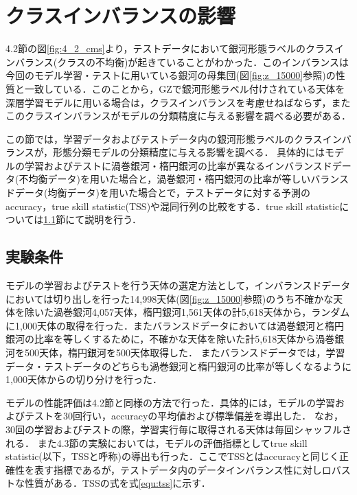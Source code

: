 \documentclass[a4j, 11pt]{jreport}
\begin{document}


\newpage
\section{クラスインバランスの影響}
4.2節の図\ref{fig:4_2_cms}より，テストデータにおいて銀河形態ラベルのクラスインバランス(クラスの不均衡)が起きていることがわかった．このインバランスは今回のモデル学習・テストに用いている銀河の母集団(図\ref{fig:z_15000}参照)の性質と一致している．このことから，GZで銀河形態ラベル付けされている天体を深層学習モデルに用いる場合は，クラスインバランスを考慮せねばならず，またこのクラスインバランスがモデルの分類精度に与える影響を調べる必要がある．

この節では，学習データおよびテストデータ内の銀河形態ラベルのクラスインバランスが，形態分類モデルの分類精度に与える影響を調べる．
具体的にはモデルの学習およびテストに渦巻銀河・楕円銀河の比率が異なるインバランスドデータ(不均衡データ)を用いた場合と，渦巻銀河・楕円銀河の比率が等しいバランスドデータ(均衡データ)を用いた場合とで，テストデータに対する予測のaccuracy，true skill statistic(TSS)や混同行列の比較をする．true skill statisticについては\ref{sec:4-3-1}節にて説明を行う．

\subsection{実験条件}
\label{sec:4-3-1}
モデルの学習およびテストを行う天体の選定方法として，インバランスドデータにおいては切り出しを行った14,998天体(図\ref{fig:z_15000}参照)のうち不確かな天体を除いた渦巻銀河4,057天体，楕円銀河1,561天体の計5,618天体から，ランダムに1,000天体の取得を行った．またバランスドデータにおいては渦巻銀河と楕円銀河の比率を等しくするために，不確かな天体を除いた計5,618天体から渦巻銀河を500天体，楕円銀河を500天体取得した．
またバランスドデータでは，学習データ・テストデータのどちらも渦巻銀河と楕円銀河の比率が等しくなるように1,000天体からの切り分けを行った．

モデルの性能評価は4.2節と同様の方法で行った．具体的には，モデルの学習およびテストを30回行い，accuracyの平均値および標準偏差を導出した．
なお，30回の学習およびテストの際，学習実行毎に取得される天体は毎回シャッフルされる．
また4.3節の実験においては，モデルの評価指標としてtrue skill statistic(以下，TSSと呼称)の導出も行った．ここでTSSとはaccuracyと同じく正確性を表す指標であるが，テストデータ内のデータインバランス性に対しロバストな性質がある．TSSの式を式\ref{equ:tss}に示す．
\end{document}
